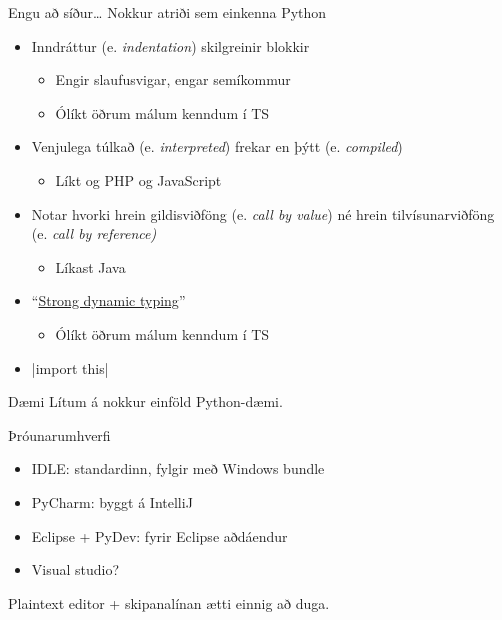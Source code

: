 \documentclass[handout]{beamer}
\begin{document}
\begin{frame}{Engu að síður\ldots}
Nokkur atriði sem einkenna Python
\begin{itemize}
 \item Inndráttur (e. \emph{indentation}) skilgreinir blokkir
 \begin{itemize}
  \item Engir slaufusvigar, engar semíkommur
  \item Ólíkt öðrum málum kenndum í TS
 \end{itemize}
 \item Venjulega túlkað (e. \emph{interpreted}) frekar en þýtt (e. \emph{compiled})
 \begin{itemize}
  \item Líkt og PHP og JavaScript
 \end{itemize}
 \item Notar hvorki hrein gildisviðföng (e. \emph{call by value}) né hrein tilvísunarviðföng (e. \emph{call by reference)}
 \begin{itemize}
  \item Líkast Java
 \end{itemize}
 \item ``\href{https://wiki.python.org/moin/Why\%20is\%20Python\%20a\%20dynamic\%20language\%20and\%20also\%20a\%20strongly\%20typed\%20language}{Strong dynamic typing}''
 \begin{itemize}
  \item Ólíkt öðrum málum kenndum í TS
 \end{itemize}
 \item {}|import this|
\end{itemize}
\end{frame}

\begin{frame}{Dæmi}
Lítum á nokkur einföld Python-dæmi.
\end{frame}

\begin{frame}{Þróunarumhverfi}
\begin{itemize}
 \item IDLE: standardinn, fylgir með Windows bundle
 \item PyCharm: byggt á IntelliJ
 \item Eclipse + PyDev: fyrir Eclipse aðdáendur
 \item Visual studio?
\end{itemize}
Plaintext editor + skipanalínan ætti einnig að duga.
\end{frame}
\end{document}
